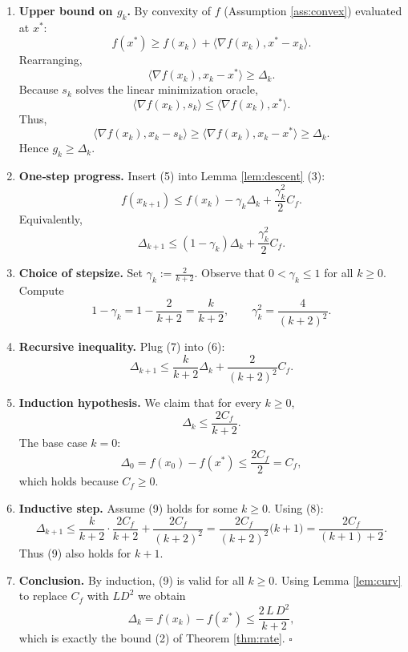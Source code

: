 \documentclass{article}
\begin{document}
\begin{enumerate}[label=[Step \arabic*], leftmargin=*]
\item \textbf{Upper bound on $g_{k}$.}  
By convexity of $f$ (Assumption \ref{ass:convex}) evaluated at $x^{*}$:
\[
f(x^{*})\ge f(x_{k})+\langle\nabla f(x_{k}),x^{*}-x_{k}\rangle.
\]
Rearranging,
\[
\langle\nabla f(x_{k}),x_{k}-x^{*}\rangle\ge \Delta_{k}.
\tag{4}
\]
Because $s_{k}$ solves the linear minimization oracle,
\[
\langle\nabla f(x_{k}),s_{k}\rangle
   \le \langle\nabla f(x_{k}),x^{*}\rangle.
\]
Thus,
\[
\langle\nabla f(x_{k}),x_{k}-s_{k}\rangle
   \ge \langle\nabla f(x_{k}),x_{k}-x^{*}\rangle
   \ge \Delta_{k}.
\tag{5}
\]
Hence $g_{k}\ge\Delta_{k}$.

\item \textbf{One‑step progress.}  
Insert (5) into Lemma \ref{lem:descent} (3):
\[
f(x_{k+1})\le f(x_{k})-\gamma_{k}\Delta_{k}
            +\frac{\gamma_{k}^{2}}{2}C_{f}.
\]
Equivalently,
\[
\Delta_{k+1}\le (1-\gamma_{k})\Delta_{k}
               +\frac{\gamma_{k}^{2}}{2}C_{f}.
\tag{6}
\]

\item \textbf{Choice of stepsize.}  
Set $\displaystyle\gamma_{k}:=\frac{2}{k+2}$.
Observe that $0<\gamma_{k}\le1$ for all $k\ge0$.
Compute
\[
1-\gamma_{k}=1-\frac{2}{k+2}= \frac{k}{k+2},
\qquad
\gamma_{k}^{2}= \frac{4}{(k+2)^{2}}.
\tag{7}
\]

\item \textbf{Recursive inequality.}  
Plug (7) into (6):
\[
\Delta_{k+1}\le
\frac{k}{k+2}\Delta_{k}
+\frac{2}{(k+2)^{2}}C_{f}.
\tag{8}
\]

\item \textbf{Induction hypothesis.}  
We claim that for every $k\ge0$,
\[
\Delta_{k}\le \frac{2C_{f}}{k+2}.
\tag{9}
\]
The base case $k=0$:
\[
\Delta_{0}=f(x_{0})-f(x^{*})\le \frac{2C_{f}}{2}=C_{f},
\]
which holds because $C_{f}\ge0$.

\item \textbf{Inductive step.}  
Assume (9) holds for some $k\ge0$.  Using (8):
\[
\Delta_{k+1}\le
\frac{k}{k+2}\cdot\frac{2C_{f}}{k+2}
+\frac{2C_{f}}{(k+2)^{2}}
=
\frac{2C_{f}}{(k+2)^{2}}\bigl(k+1\bigr)
=
\frac{2C_{f}}{(k+1)+2}.
\]
Thus (9) also holds for $k+1$.

\item \textbf{Conclusion.}  
By induction, (9) is valid for all $k\ge0$.  Using Lemma \ref{lem:curv}
to replace $C_{f}$ with $L D^{2}$ we obtain
\[
\Delta_{k}=f(x_{k})-f(x^{*})
\le \frac{2\,L\,D^{2}}{k+2},
\]
which is exactly the bound (2) of Theorem \ref{thm:rate}.  $\square$
\end{enumerate}
\end{document}
